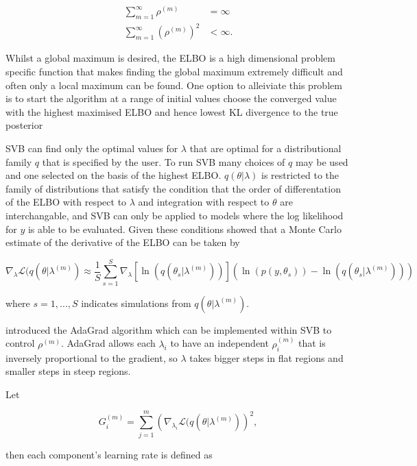 \documentclass[12pt,a4paper]{article}%
\numberwithin{equation}{section}
\begin{document}
\begin{align}
\sum_{m=1}^{\infty} \rho^{(m)} &=  \infty \\
\sum_{m=1}^{\infty} (\rho^{(m)})^2 &<  \infty.
\end{align}

Whilst a global maximum is desired, the ELBO is a high dimensional problem specific function that makes finding the global maximum extremely difficult and often only a local maximum can be found. One option to alleiviate this problem is to start the algorithm at a range of initial values choose the converged value with the highest maximised ELBO and hence lowest KL divergence to the true posterior 

SVB can find only the optimal values for $\lambda$ that are optimal for a distributional family $q$ that is specified by the user. To run SVB many choices of $q$ may be used and one selected on the basis of the highest ELBO. $q(\theta | \lambda)$ is restricted to the family of distributions that satisfy the condition that the order of differentation of the ELBO with respect to $\lambda$ and integration with respect to $\theta$ are interchangable, and SVB can only be applied to models where the log likelihood for $y$ is able to be evaluated. Given these conditions \citet{Ranganath2014} showed that a Monte Carlo estimate of the derivative of the ELBO can be taken by

\begin{equation}
\label{SGA2}
\nabla_{\lambda}\mathcal{L}(q(\theta | \lambda^{(m)}) \approx \frac{1}{S}\sum_{s=1}^{S} \nabla_{\lambda} [\ln(q(\theta_s | \lambda^{(m)}))] (\ln (p(y, \theta_s)) - \ln(q(\theta_s | \lambda^{(m)})))
\end{equation}

where $s = 1, \dots, S$ indicates simulations from $q(\theta | \lambda^{(m)})$.

\citet{Duchi2011} introduced the AdaGrad algorithm which can be implemented within SVB to control $\rho^{(m)}$. AdaGrad allows each $\lambda_i$ to have an independent $\rho^{(m)}_i$ that is inversely proportional to the gradient, so $\lambda$ takes bigger steps in flat regions and smaller steps in steep regions. 

Let 

\begin{equation}
\label{SGA3}
G_i^{(m)} = \sum_{j = 1}^{m} \left(\nabla_{\lambda_i}\mathcal{L}(q(\theta | \lambda^{(m)})\right)^2,
\end{equation}

then each component's learning rate is defined as
\end{document}
